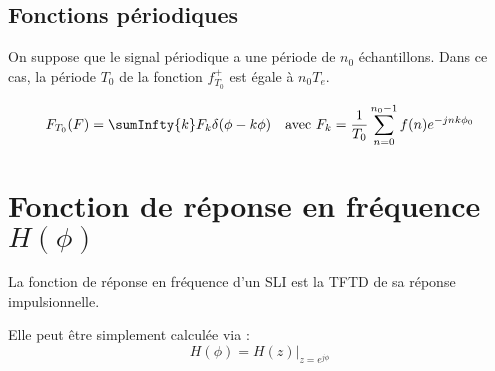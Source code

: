     \subsection{Fonctions périodiques}
        On suppose que le signal périodique a une période de $n_0$ échantillons. Dans ce cas, la période $T_0$ de la fonction $f^+_{T_0}$ est égale à $n_0 T_e$.

        \begin{align*}
            &F_{T_0}(F) = \sumInfty{k} F_k \delta(\phi - k\phi)    &\text{avec } F_k = \frac{1}{T_0} \sum_{n=0}^{n_0-1} f(n) e^{-jnk\phi_0}
        \end{align*}

\section{Fonction de réponse en fréquence $H(\phi)$}
    La fonction de réponse en fréquence d'un SLI est la TFTD de sa réponse impulsionnelle.

    Elle peut être simplement calculée via :
    $$
        H(\phi) = {\left.H(z)\right|}_{z=e^{j\phi}}
    $$